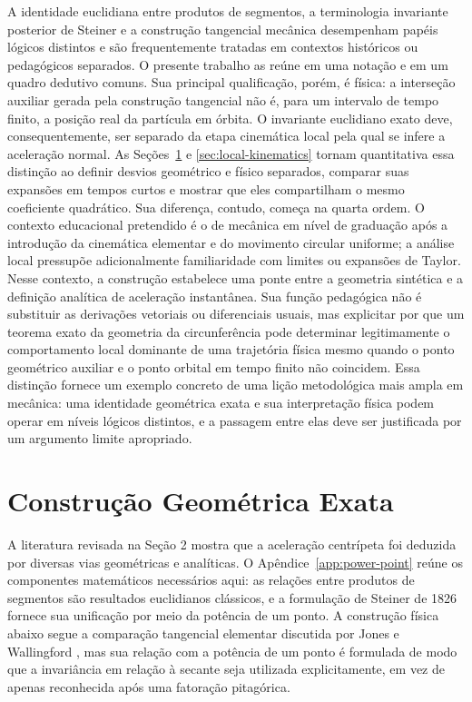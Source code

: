 \documentclass[12pt,a4paper]{article}
\numberwithin{equation}{section}
\theoremstyle{remark}
\begin{document}
A identidade euclidiana entre produtos de segmentos, a terminologia invariante posterior de Steiner e a construção tangencial mecânica desempenham papéis lógicos distintos e são frequentemente tratadas em contextos históricos ou pedagógicos separados. O presente trabalho as reúne em uma notação e em um quadro dedutivo comuns. Sua principal qualificação, porém, é física: a interseção auxiliar gerada pela construção tangencial não é, para um intervalo de tempo finito, a posição real da partícula em órbita. O invariante euclidiano exato deve, consequentemente, ser separado da etapa cinemática local pela qual se infere a aceleração normal. As Seções~\ref{sec:exact-geometry} e \ref{sec:local-kinematics} tornam quantitativa essa distinção ao definir desvios geométrico e físico separados, comparar suas expansões em tempos curtos e mostrar que eles compartilham o mesmo coeficiente quadrático. Sua diferença, contudo, começa na quarta ordem. O contexto educacional pretendido é o de mecânica em nível de graduação após a introdução da cinemática elementar e do movimento circular uniforme; a análise local pressupõe adicionalmente familiaridade com limites ou expansões de Taylor. Nesse contexto, a construção estabelece uma ponte entre a geometria sintética e a definição analítica de aceleração instantânea. Sua função pedagógica não é substituir as derivações vetoriais ou diferenciais usuais, mas explicitar por que um teorema exato da geometria da circunferência pode determinar legitimamente o comportamento local dominante de uma trajetória física mesmo quando o ponto geométrico auxiliar e o ponto orbital em tempo finito não coincidem. Essa distinção fornece um exemplo concreto de uma lição metodológica mais ampla em mecânica: uma identidade geométrica exata e sua interpretação física podem operar em níveis lógicos distintos, e a passagem entre elas deve ser justificada por um argumento limite apropriado.

\section{Construção Geométrica Exata}\label{sec:exact-geometry}

A literatura revisada na Seção 2 mostra que a aceleração centrípeta foi deduzida por diversas vias geométricas e analíticas. O Apêndice~\ref{app:power-point} reúne os componentes matemáticos necessários aqui: as relações entre produtos de segmentos são resultados euclidianos clássicos, e a formulação de Steiner de 1826 \cite{steiner1826einige} fornece sua unificação por meio da potência de um ponto. A construção física abaixo segue a comparação tangencial elementar discutida por Jones e Wallingford \cite{jones1969simple}, mas sua relação com a potência de um ponto é formulada de modo que a invariância em relação à secante seja utilizada explicitamente, em vez de apenas reconhecida após uma fatoração pitagórica.
\end{document}

